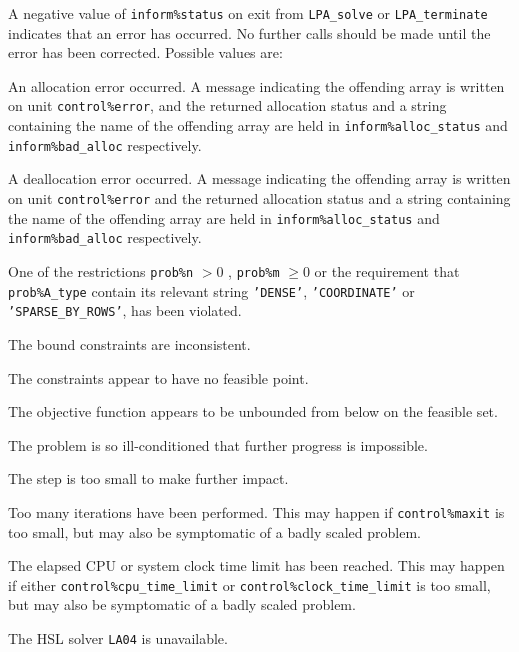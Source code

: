 \documentclass{galahad}
\newcommand{\packagename}{LPA}
\begin{document}

\galerrors
A negative value of {\tt inform\%status} on exit from
{\tt \packagename\_solve}
or
{\tt \packagename\_terminate}
indicates that an error has occurred. No further calls should be made
until the error has been corrected. Possible values are:

\begin{description}

 An allocation error occurred. A message indicating
the offending
array is written on unit {\tt control\%error}, and the returned allocation
status and a string containing the name of the offending array
are held in {\tt inform\%alloc\_\-status}
and {\tt inform\%bad\_alloc} respectively.

 A deallocation error occurred.
A message indicating the offending
array is written on unit {\tt control\%error} and the returned allocation
status and a string containing the name of the offending array
are held in {\tt inform\%alloc\_\-status}
and {\tt inform\%bad\_alloc} respectively.

 One of the restrictions
 {\tt prob\%n} $> 0$ ,  {\tt prob\%m} $\geq 0$ or
    the requirement that {\tt prob\%A\_type} contain its relevant string
    {\tt 'DENSE'}, {\tt 'COORDINATE'} or {\tt 'SPARSE\_BY\_ROWS'},
    has been violated.

 The bound constraints are inconsistent.

 The constraints appear to have no feasible point.

 The objective function appears to be unbounded
  from below on the feasible set.



 The problem is so ill-conditioned that
 further progress is impossible.

 The step is too small to make further impact.

 Too many iterations have been performed.
   This may happen if
    {\tt control\%maxit} is too small, but may also be symptomatic of
    a badly scaled problem.

 The elapsed CPU or system clock time limit has been
    reached. This may happen if either {\tt control\%cpu\_time\_limit} or
    {\tt control\%clock\_time\_limit} is too small, but may also be symptomatic
    of a badly scaled problem.

 The HSL solver {\tt LA04} is unavailable.

\end{description}
\end{document}
